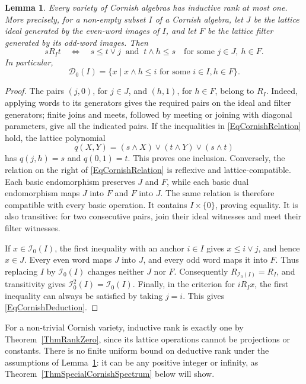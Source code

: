 \documentclass[12pt,english]{amsart}
\newtheorem{lemma}[theorem]{Lemma}
\theoremstyle{definition}
\numberwithin{equation}{section}
\theoremstyle{remark}
\begin{document}
\begin{lemma}\label{LemCornishInduction}
Every variety of Cornish algebras has inductive rank at most one.
More precisely, for a non-empty subset $I$ of a Cornish algebra, let
$J$ be the lattice ideal generated by the even-word images of $I$, and
let $F$ be the lattice filter generated by its odd-word images. Then
\begin{equation}\label{EqCornishRelation}
sR_It\quad\Longleftrightarrow\quad
s\leqslant t\vee j\ \text{ and }\ t\wedge h\leqslant s
\quad\text{for some }j\in J,\ h\in F.
\end{equation}
In particular,
\begin{equation}\label{EqCornishDeduction}
\mathcal D_0(I)=
\{x\mid x\wedge h\leqslant i\text{ for some }i\in I, h\in F\}.
\end{equation}
\end{lemma}

\begin{proof}
The pairs $(j,0)$, for $j\in J$, and $(h,1)$, for $h\in F$, belong
to $R_I$. Indeed, applying words to its generators gives the required
pairs on the ideal and filter generators; finite joins and meets,
followed by meeting or joining with diagonal parameters, give all the
indicated pairs. If the inequalities in
\eqref{EqCornishRelation} hold, the lattice polynomial
\[
q(X,Y)=(s\wedge X)\vee(t\wedge Y)\vee(s\wedge t)
\]
has $q(j,h)=s$ and $q(0,1)=t$. This proves one inclusion. Conversely,
the relation on the right of \eqref{EqCornishRelation} is reflexive
and lattice-compatible. Each basic endomorphism preserves $J$ and
$F$, while each basic dual endomorphism maps $J$ into $F$ and $F$ into
$J$. The same relation is therefore compatible with every basic
operation. It contains $I\times\{0\}$, proving equality. It is also
transitive: for two consecutive pairs, join their ideal witnesses and
meet their filter witnesses.

If $x\in\mathcal I_0(I)$, the first inequality with an anchor $i\in I$
gives $x\leqslant i\vee j$, and hence $x\in J$. Every even word maps
$J$ into $J$, and every odd word maps it into $F$. Thus replacing $I$
by $\mathcal I_0(I)$ changes neither $J$ nor $F$. Consequently
$R_{\mathcal I_0(I)}=R_I$, and transitivity gives
$\mathcal I_0^2(I)=\mathcal I_0(I)$. Finally, in the criterion for
$iR_Ix$, the first inequality can always be satisfied by taking $j=i$.
This gives \eqref{EqCornishDeduction}.
\end{proof}

For a non-trivial Cornish variety, inductive rank is exactly one by
Theorem~\ref{ThmRankZero}, since its lattice operations cannot be
projections or constants. There is no finite uniform bound on
deductive rank under the assumptions of Lemma~\ref{LemCornishInduction}:
it can be any positive integer or infinity, as
Theorem~\ref{ThmSpecialCornishSpectrum} below will show.
\end{document}
